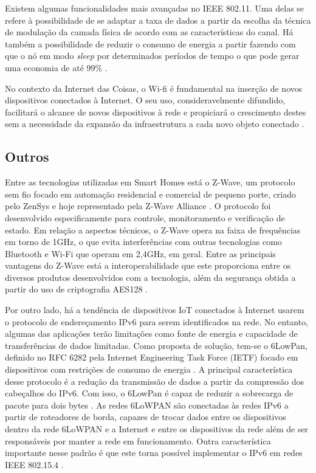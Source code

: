 

Existem algumas funcionalidades mais avançadas no IEEE 802.11. Uma delas se refere à possibilidade de se adaptar a taxa de dados a partir da escolha da técnica de modulação da camada física de acordo com as características do canal. Há também a possibilidade de reduzir o consumo de energia a partir fazendo com que o nó em modo \textit{sleep} por determinados períodos de tempo o que pode gerar uma economia de até 99\% \cite{Kurose2012}.

No contexto da Internet das Coisas, o Wi-fi é fundamental na inserção de novos dispositivos conectados à Internet. O seu uso, consideravelmente difundido, facilitará o alcance de novos dispositivos à rede e propiciará o crescimento destes sem a necessidade da expansão da infraestrutura a cada novo objeto conectado \cite{Suresh2014}.

\subsection{Outros}
Entre as tecnologias utilizadas em Smart Homes está o Z-Wave, um protocolo sem fio focado em automação residencial e comercial de pequeno porte, criado pelo ZenSys e hoje representado pela Z-Wave Alliance  \cite{Gomez2010}. O protocolo foi desenvolvido especificamente para controle, monitoramento e verificação de estado. Em relação a aspectos técnicos, o Z-Wave opera na faixa de frequências em torno de 1GHz, o que evita interferências com outras tecnologias como Bluetooth e Wi-Fi que operam em 2,4GHz, em geral. Entre as principais vantagens do Z-Wave está a interoperabilidade que este proporciona entre os diversos produtos desenvolvidos com a tecnologia, além da segurança obtida a partir do uso de criptografia AES128 \cite{Z-WaveAlliance2015}.

Por outro lado, há a tendência de dispositivos IoT conectados à Internet usarem o protocolo de endereçamento IPv6 para serem identificados na rede. No entanto, algumas das aplicações terão limitações como fonte de energia e capacidade de transferências de dados limitadas. Como proposta de solução, tem-se o 6LowPan, definido no RFC 6282 pela Internet Engineering Task Force (IETF) focado em dispositivos com restrições de consumo de energia \cite{Olsson2014}. A principal característica desse protocolo é a redução da transmissão de dados a partir da compressão dos cabeçalhos do IPv6. Com isso, o 6LowPan é capaz de reduzir a sobrecarga de pacote para dois bytes \cite{Al-Fuqaha2015}. As redes 6LoWPAN são conectadas às redes IPv6 a partir de roteadores de borda, capazes de trocar dados entre os dispositivos dentro da rede 6LoWPAN e a Internet e  entre os dispositivos da rede além de ser responsáveis por manter a rede em funcionamento. Outra característica importante nesse padrão é que este torna possível implementar o IPv6 em redes IEEE 802.15.4 \cite{Olsson2014}.


